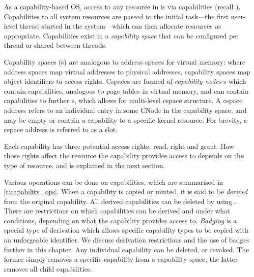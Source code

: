 As a capability-based \gls{OS}, access to any resource in \selfour is via capabilities (recall
). Capabilities to all system resources are passed to the initial task---the first
user-level thread started in the system---which can then allocate resources as appropriate.
Capabilities exist in a \emph{capability space} that can be configured per thread or shared between
threads. 

Capability spaces (s) are analogous to address spaces for virtual memory: where address spaces map
virtual addresses to physical addresses, capability spaces map object identifiers to access rights.
Cspaces are formed of \emph{capability nodes} s which contain capabilities, analogous to page tables
in virtual memory, and can contain capabilities to further s, which allows for multi-level
cspace structure. A cspace address refers
to an individual entry in some CNode in the capability space, and may be empty or contain a
capability to a specific kernel resource. For brevity, a cspace address is referred to as
a slot. 

Each capability has three potential access rights: read, right and grant. How those rights affect
the resource the capability provides access to depends on the type of resource, and is explained in
the next section.

Various operations can be done on capabilities, which are summarised in \cref{t:capability_ops}.
When a capability is copied or minted, it is said to be \emph{derived} from the original capability.
All derived capabilities can be deleted by using .
There are restrictions on which capabilities can be derived and under what conditions, depending on
what the capability provides access to. 
\emph{Badging} is a special type of derivation which allows specific capability types to be copied
with an unforgeable identifier. We discuss derivation restrictions and the use of badges further
in this chapter.
Any individual capability can be deleted, or revoked. The former simply removes a specific
capability from a capability space, the latter removes all child capabilities.

